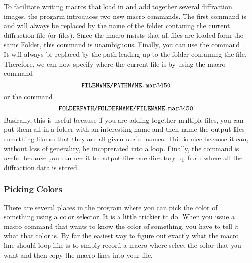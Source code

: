 To facilitate writing macros that load in and 
add together several diffraction images, the progarm
introduces two new macro commands. The first command is
 and will always be replaced
by the name of the folder contaning the current
diffraction file (or files). Since the macro insists 
that all files are loaded form the same Folder, this
command is unambiguous. Finally, you can use the 
command . It will always be 
replaced by the path leading up to the folder 
containing the file. Therefore, we can now specify 
where the current file is by using the macro command
\begin{equation*}
    \text{{\ttfamily FILENAME/PATHNAME.mar3450}}
\end{equation*}
or the command
\begin{equation*}
    \text{{\ttfamily FOLDERPATH/FOLDERNAME/FILENAME.mar3450}}
\end{equation*}
Basically, this is useful because if you are adding
together multiple files, you can put them all in a
folder with an interesting name and then name 
the output files something like 
 so that they are all
given useful names. This is nice because it can, without
loss of generality, be incoprerated into a loop. Finally,
the  command is useful because you
can use it to output files one directory up from where all
the diffraction data is stored.

\subsubsection{Picking Colors}

There are several places in the program where you can
pick the color of something using a color selector.
It is a little trickier to do.  When you issue a macro 
command that wants to know the color of something, you 
have to tell it what that color is. By far the easiest
way to figure out exactly what the macro line should
loop like is to simply record a macro where select
the color that you want and then copy the macro lines
into your file.

